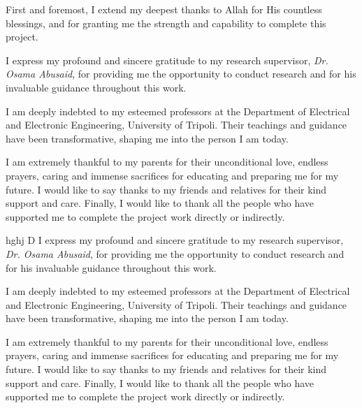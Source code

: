 
\begin{acknowledgements}      


First and foremost, I extend my deepest thanks to Allah for His countless blessings, and for granting me the strength and capability to complete this project.

I express my profound and sincere gratitude to my research supervisor, \textit{Dr. Osama Abusaid}, for providing me the opportunity to conduct research and for his invaluable guidance throughout this work.

I am deeply indebted to my esteemed professors at the Department of Electrical and Electronic Engineering, University of Tripoli. Their teachings and guidance have been transformative, shaping me into the person I am today.

I am extremely thankful to my parents for their unconditional love, endless
prayers, caring and immense sacrifices for educating and preparing me for my
future. I would like to say thanks to my friends and relatives for their kind support
and care.
Finally, I would like to thank all the people who have supported me to complete
the project work directly or indirectly.




hghj
D
I express my profound and sincere gratitude to my research supervisor, \textit{Dr. Osama Abusaid}, for providing me the opportunity to conduct research and for his invaluable guidance throughout this work.

I am deeply indebted to my esteemed professors at the Department of Electrical and Electronic Engineering, University of Tripoli. Their teachings and guidance have been transformative, shaping me into the person I am today.

I am extremely thankful to my parents for their unconditional love, endless
prayers, caring and immense sacrifices for educating and preparing me for my
future. I would like to say thanks to my friends and relatives for their kind support
and care.
Finally, I would like to thank all the people who have supported me to complete
the project work directly or indirectly.










\end{acknowledgements}
